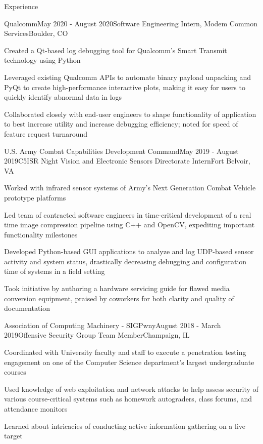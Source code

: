 \documentclass{resume} %
\begin{document}
\begin{rSection}{Experience}

\begin{rSubsection}{Qualcomm}{May 2020 - August 2020}{Software Engineering Intern, Modem Common Services}{Boulder, CO}
\item Created a Qt-based log debugging tool for Qualcomm's Smart Transmit technology using Python
\item Leveraged existing Qualcomm APIs to automate binary payload unpacking and PyQt to create high-performance interactive plots, making it easy for users to quickly identify abnormal data in logs
\item Collaborated closely with end-user engineers to shape functionality of application to best increase utility and increase debugging efficiency; noted for speed of feature request turnaround
\end{rSubsection}

\begin{rSubsection}{U.S. Army Combat Capabilities Development Command}{May 2019 - August 2019}{C5ISR Night Vision and Electronic Sensors Directorate Intern}{Fort Belvoir, VA}
\item Worked with infrared sensor systems of Army's Next Generation Combat Vehicle prototype platforms 
\item Led team of contracted software engineers in time-critical development of a real time image compression pipeline using C++ and OpenCV, expediting important functionality milestones
\item Developed Python-based GUI applications to analyze and log UDP-based sensor activity and system status, drastically decreasing debugging and configuration time of systems in a field setting
\item Took initiative by authoring a hardware servicing guide for flawed media conversion equipment, praised by coworkers for both clarity and quality of documentation
\end{rSubsection}

\begin{rSubsection}{Association of Computing Machinery - SIGPwny}{August 2018 - March 2019}{Offensive Security Group Team Member}{Champaign, IL}
\item Coordinated with University faculty and staff to execute a penetration testing engagement on one of the Computer Science
department's largest undergraduate courses
\item Used knowledge of web exploitation and network attacks to help assess security of various course-critical
systems such as homework autograders, class forums, and attendance monitors
\item Learned about intricacies of conducting active information gathering on a live target
\end{rSubsection}


\end{rSection}
\end{document}
